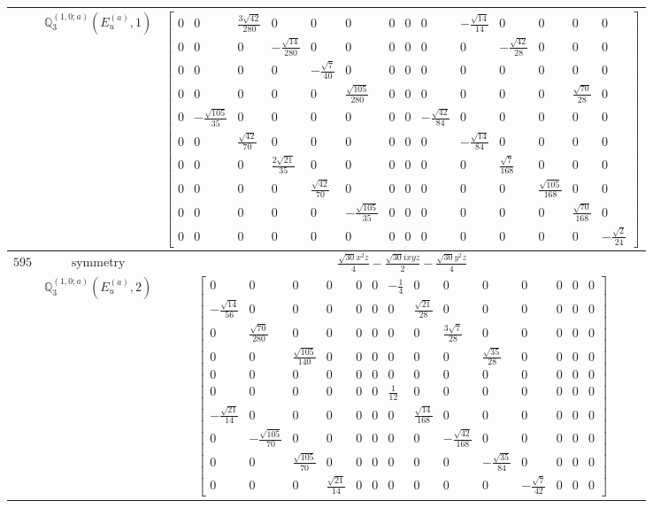 \documentclass[fleqn,8pt,landscape]{jsarticle}
\begin{document}
\begin{longtable}{ccc}
$  $ & $ \mathbb{Q}_{3}^{(1,0;a)}(E_{u}^{(a)},1) $ & $ \begin{bmatrix} 0 & 0 & \frac{3 \sqrt{42}}{280} & 0 & 0 & 0 & 0 & 0 & 0 & - \frac{\sqrt{14}}{14} & 0 & 0 & 0 & 0 \\ 0 & 0 & 0 & - \frac{\sqrt{14}}{280} & 0 & 0 & 0 & 0 & 0 & 0 & - \frac{\sqrt{42}}{28} & 0 & 0 & 0 \\ 0 & 0 & 0 & 0 & - \frac{\sqrt{7}}{40} & 0 & 0 & 0 & 0 & 0 & 0 & 0 & 0 & 0 \\ 0 & 0 & 0 & 0 & 0 & \frac{\sqrt{105}}{280} & 0 & 0 & 0 & 0 & 0 & 0 & \frac{\sqrt{70}}{28} & 0 \\ 0 & - \frac{\sqrt{105}}{35} & 0 & 0 & 0 & 0 & 0 & 0 & - \frac{\sqrt{42}}{84} & 0 & 0 & 0 & 0 & 0 \\ 0 & 0 & \frac{\sqrt{42}}{70} & 0 & 0 & 0 & 0 & 0 & 0 & - \frac{\sqrt{14}}{84} & 0 & 0 & 0 & 0 \\ 0 & 0 & 0 & \frac{2 \sqrt{21}}{35} & 0 & 0 & 0 & 0 & 0 & 0 & \frac{\sqrt{7}}{168} & 0 & 0 & 0 \\ 0 & 0 & 0 & 0 & \frac{\sqrt{42}}{70} & 0 & 0 & 0 & 0 & 0 & 0 & \frac{\sqrt{105}}{168} & 0 & 0 \\ 0 & 0 & 0 & 0 & 0 & - \frac{\sqrt{105}}{35} & 0 & 0 & 0 & 0 & 0 & 0 & \frac{\sqrt{70}}{168} & 0 \\ 0 & 0 & 0 & 0 & 0 & 0 & 0 & 0 & 0 & 0 & 0 & 0 & 0 & - \frac{\sqrt{2}}{24} \end{bmatrix} $ \\ \hline
$ 595 $ & $ \text{symmetry} $ & $ \frac{\sqrt{30} x^{2} z}{4} - \frac{\sqrt{30} i x y z}{2} - \frac{\sqrt{30} y^{2} z}{4} $ \\
$  $ & $ \mathbb{Q}_{3}^{(1,0;a)}(E_{u}^{(a)},2) $ & $ \begin{bmatrix} 0 & 0 & 0 & 0 & 0 & 0 & - \frac{1}{4} & 0 & 0 & 0 & 0 & 0 & 0 & 0 \\ - \frac{\sqrt{14}}{56} & 0 & 0 & 0 & 0 & 0 & 0 & \frac{\sqrt{21}}{28} & 0 & 0 & 0 & 0 & 0 & 0 \\ 0 & \frac{\sqrt{70}}{280} & 0 & 0 & 0 & 0 & 0 & 0 & \frac{3 \sqrt{7}}{28} & 0 & 0 & 0 & 0 & 0 \\ 0 & 0 & \frac{\sqrt{105}}{140} & 0 & 0 & 0 & 0 & 0 & 0 & \frac{\sqrt{35}}{28} & 0 & 0 & 0 & 0 \\ 0 & 0 & 0 & 0 & 0 & 0 & 0 & 0 & 0 & 0 & 0 & 0 & 0 & 0 \\ 0 & 0 & 0 & 0 & 0 & 0 & \frac{1}{12} & 0 & 0 & 0 & 0 & 0 & 0 & 0 \\ - \frac{\sqrt{21}}{14} & 0 & 0 & 0 & 0 & 0 & 0 & \frac{\sqrt{14}}{168} & 0 & 0 & 0 & 0 & 0 & 0 \\ 0 & - \frac{\sqrt{105}}{70} & 0 & 0 & 0 & 0 & 0 & 0 & - \frac{\sqrt{42}}{168} & 0 & 0 & 0 & 0 & 0 \\ 0 & 0 & \frac{\sqrt{105}}{70} & 0 & 0 & 0 & 0 & 0 & 0 & - \frac{\sqrt{35}}{84} & 0 & 0 & 0 & 0 \\ 0 & 0 & 0 & \frac{\sqrt{21}}{14} & 0 & 0 & 0 & 0 & 0 & 0 & - \frac{\sqrt{7}}{42} & 0 & 0 & 0 \end{bmatrix} $ \\ \hline

\end{longtable}
\end{document}
